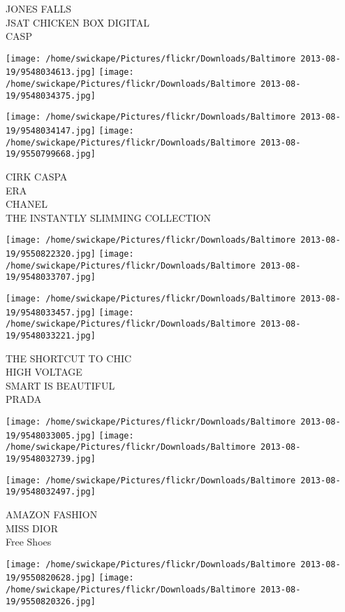 \documentclass[10pt,letterpaper]{article}
\begin{document}
JONES FALLS\\
JSAT CHICKEN BOX DIGITAL\\
CASP\\
\pagebreak

\texttt{[image: /home/swickape/Pictures/flickr/Downloads/Baltimore 2013-08-19/9548034613.jpg]}
\texttt{[image: /home/swickape/Pictures/flickr/Downloads/Baltimore 2013-08-19/9548034375.jpg]}

\texttt{[image: /home/swickape/Pictures/flickr/Downloads/Baltimore 2013-08-19/9548034147.jpg]}
\texttt{[image: /home/swickape/Pictures/flickr/Downloads/Baltimore 2013-08-19/9550799668.jpg]}

CIRK CASPA\\
ERA\\
CHANEL\\
THE INSTANTLY SLIMMING COLLECTION\\
\pagebreak

\texttt{[image: /home/swickape/Pictures/flickr/Downloads/Baltimore 2013-08-19/9550822320.jpg]}
\texttt{[image: /home/swickape/Pictures/flickr/Downloads/Baltimore 2013-08-19/9548033707.jpg]}

\texttt{[image: /home/swickape/Pictures/flickr/Downloads/Baltimore 2013-08-19/9548033457.jpg]}
\texttt{[image: /home/swickape/Pictures/flickr/Downloads/Baltimore 2013-08-19/9548033221.jpg]}

THE SHORTCUT TO CHIC\\
HIGH VOLTAGE\\
SMART IS BEAUTIFUL\\
PRADA\\
\pagebreak

\texttt{[image: /home/swickape/Pictures/flickr/Downloads/Baltimore 2013-08-19/9548033005.jpg]}
\texttt{[image: /home/swickape/Pictures/flickr/Downloads/Baltimore 2013-08-19/9548032739.jpg]}

\vspace{0.25in}
\texttt{[image: /home/swickape/Pictures/flickr/Downloads/Baltimore 2013-08-19/9548032497.jpg]}

AMAZON FASHION\\
MISS DIOR\\
Free Shoes\\
\pagebreak

\texttt{[image: /home/swickape/Pictures/flickr/Downloads/Baltimore 2013-08-19/9550820628.jpg]}
\texttt{[image: /home/swickape/Pictures/flickr/Downloads/Baltimore 2013-08-19/9550820326.jpg]}
\end{document}
